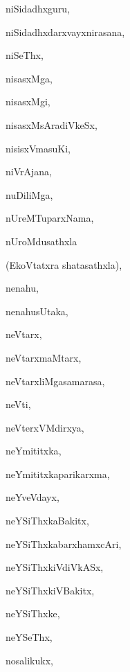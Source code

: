 \begin{multicols}{3}
{\noindent
{niSidadhxguru}, \pageref{niSidadhxguru}

\noindent
{niSidadhxdarxvayxnirasana}, \pageref{niSidadhxdarxvayxnirasana}

\noindent
{niSeThx}, \pageref{niSeThx}

\noindent
{nisasxMga}, \pageref{nisasxMga}

\noindent
{nisasxMgi}, \pageref{nisasxMgi}

\noindent
{nisasxMsAradiVkeSx}, \pageref{nisasxMsAradiVkeSx}

\noindent
{nisisxVmasuKi}, \pageref{nisisxVmasuKi}

\noindent
{niVrAjana}, \pageref{niVrAjana}

\noindent
{nuDiliMga}, \pageref{nuDiliMga}

\noindent
{nUreMTuparxNama}, \pageref{nUreMTuparxNama}

\noindent
{nUroMdusathxla}

\noindent
\qquad (EkoVtatxra shatasathxla), \pageref{nUroMdusathxlaEkoVtatxra shatasathxla}

\noindent
{nenahu}, \pageref{nenahu}

\noindent
{nenahusUtaka}, \pageref{nenahusUtaka}

\noindent
{neVtarx}, \pageref{neVtarx}

\noindent
{neVtarxmaMtarx}, \pageref{neVtarxmaMtarx}

\noindent
{neVtarxliMgasamarasa}, \pageref{neVtarxliMgasamarasa}

\noindent
{neVti}, \pageref{neVti}

\noindent
{neVterxVMdirxya}, \pageref{neVterxVMdirxya}

\noindent
{neYmititxka}, \pageref{neYmititxka}

\noindent
{neYmititxkaparikarxma}, \pageref{neYmititxkaparikarxma}

\noindent
{neYveVdayx}, \pageref{neYveVdayx}

\noindent
{neYSiThxkaBakitx}, \pageref{neYSiThxkaBakitx}

\noindent
{neYSiThxkabarxhamxcAri}, \pageref{neYSiThxkabarxhamxcAri}

\noindent
{neYSiThxkiVdiVkASx}, \pageref{neYSiThxkiVdiVkASx}

\noindent
{neYSiThxkiVBakitx}, \pageref{neYSiThxkiVBakitx}

\noindent
{neYSiThxke}, \pageref{neYSiThxke}

\noindent
{neYSeThx}, \pageref{neYSeThx}

\noindent
{nosalikukx}, \pageref{nosalikukx}

}
\end{multicols}
